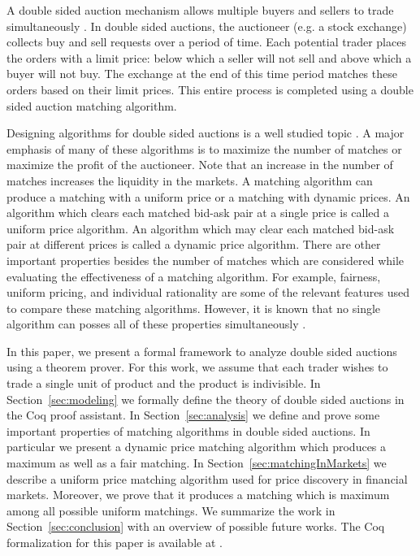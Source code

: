 \documentclass[a4paper,UKenglish,cleveref, autoref]{lipics-v2019}
\begin{document}
A double sided auction mechanism allows multiple buyers and sellers to trade simultaneously \cite{friedman}. In double sided auctions, the auctioneer (e.g. a stock exchange) collects buy and sell requests over a period of time. Each potential trader places the orders with a limit price: below which a seller will not sell and above which a buyer will not buy. The exchange at the end of this time period matches these orders based on their limit prices. This entire process is completed using a double sided auction matching algorithm.

Designing algorithms for double sided auctions is a well studied topic \cite{mcafee1992, WurmanWW98,NiuP13}. A major emphasis of many of these algorithms is to maximize the number of matches or maximize the profit of the auctioneer. Note that an increase in the number of matches increases the liquidity in the markets. A matching algorithm can produce a matching with a uniform price or a matching with dynamic prices. An algorithm which clears each matched bid-ask pair at a single price is called a uniform price algorithm. An algorithm which may clear each matched bid-ask pair at different prices is called a dynamic price algorithm. There are other important properties besides the number of matches which are considered while evaluating the effectiveness of a matching algorithm. For example, fairness, uniform pricing, and individual rationality are some of the relevant features used to compare these matching algorithms. However, it is known that no single algorithm can posses all of these properties simultaneously \cite{WurmanWW98,mcafee1992}.

In this paper, we present a formal framework to analyze double sided auctions using a theorem prover. For this work, we assume that each trader wishes to trade a single unit of product and the product is indivisible. In Section~\ref{sec:modeling} we formally define the theory of double sided auctions in the Coq proof assistant. In Section~\ref{sec:analysis} we define and prove some important properties of matching algorithms in double sided auctions. In particular we present a dynamic price matching algorithm which produces a maximum as well as a fair matching. In Section~\ref{sec:matchingInMarkets} we describe a uniform price matching algorithm used for price discovery in financial markets. Moreover, we prove that it produces a matching which is maximum among all possible uniform matchings. We summarize the work in Section~\ref{sec:conclusion} with an overview of possible future works. The Coq formalization for this paper is available at \cite{auctiongithub}.  
\end{document}

